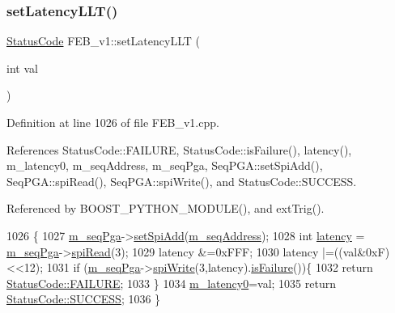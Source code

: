 \subsubsection{\texorpdfstring{set\+Latency\+L\+L\+T()}{setLatencyLLT()}}
{\footnotesize\ttfamily \hyperlink{classStatusCode}{Status\+Code} F\+E\+B\+\_\+v1\+::set\+Latency\+L\+LT (\begin{DoxyParamCaption}\item[{int}]{val }\end{DoxyParamCaption})}



Definition at line 1026 of file F\+E\+B\+\_\+v1.\+cpp.



References Status\+Code\+::\+F\+A\+I\+L\+U\+RE, Status\+Code\+::is\+Failure(), latency(), m\+\_\+latency0, m\+\_\+seq\+Address, m\+\_\+seq\+Pga, Seq\+P\+G\+A\+::set\+Spi\+Add(), Seq\+P\+G\+A\+::spi\+Read(), Seq\+P\+G\+A\+::spi\+Write(), and Status\+Code\+::\+S\+U\+C\+C\+E\+SS.



Referenced by B\+O\+O\+S\+T\+\_\+\+P\+Y\+T\+H\+O\+N\+\_\+\+M\+O\+D\+U\+L\+E(), and ext\+Trig().


\begin{DoxyCode}
1026                                        \{
1027   \hyperlink{classFEB__v1_a6c7804ac86796f233a8393043adf2e77}{m\_seqPga}->\hyperlink{classSeqPGA_ac998ce3a6d9b5f2e88cc8393f8c1df53}{setSpiAdd}(\hyperlink{classFEB__v1_a1c1eb093fd1733b9510fcf8bc5c7ad08}{m\_seqAddress});
1028   \textcolor{keywordtype}{int} \hyperlink{classFEB__v1_a68050d232efd8d6568910b09a2c18f62}{latency} = \hyperlink{classFEB__v1_a6c7804ac86796f233a8393043adf2e77}{m\_seqPga}->\hyperlink{classSeqPGA_ab3d0e5e5d4014bc7a92588a76b8713d4}{spiRead}(3);
1029   latency &=0xFFF;
1030   latency |=((val&0xF)<<12);
1031    \textcolor{keywordflow}{if} (\hyperlink{classFEB__v1_a6c7804ac86796f233a8393043adf2e77}{m\_seqPga}->\hyperlink{classSeqPGA_ad4421841ce4ce8b88ad13f63216f0743}{spiWrite}(3,latency).\hyperlink{classStatusCode_a5dd22dc6eb2c52fc4cabc58f6dea2eb7}{isFailure}())\{
1032     \textcolor{keywordflow}{return} \hyperlink{classStatusCode_a6f565cbeadc76d14c72f047e5e85eb4ba3da73d4c469762eb9d3c960368252b26}{StatusCode::FAILURE};
1033   \}
1034    \hyperlink{classFEB__v1_a23a3d8bfbf96490890140f13b08a02c1}{m\_latency0}=val;
1035   \textcolor{keywordflow}{return} \hyperlink{classStatusCode_a6f565cbeadc76d14c72f047e5e85eb4badd0da38d3ba0d922efd1f4619bc37ad8}{StatusCode::SUCCESS};   
1036 \}
\end{DoxyCode}
\mbox{\label{classFEB__v1_a935e78031961cff9330e82a70bf91052}} 
